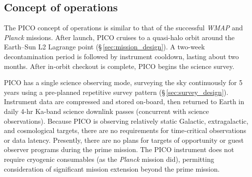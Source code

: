 \subsection{Concept of operations}
\label{sec:operations} %

The PICO concept of operations is similar to that of the successful
\textit{WMAP} \citep{Bennett2003} and \textit{Planck} \citep{Tauber2010} missions. After launch,
PICO cruises to a quasi-halo orbit around the Earth--Sun L2 Lagrange point
(\S\,\ref{sec:mission_design}). A two-week decontamination period is followed by
instrument cooldown, lasting about two months. After in-orbit checkout is complete, PICO begins
the science survey.

PICO has a single science observing mode, surveying the sky
continuously for 5 years using a pre-planned repetitive survey pattern
(\S\,\ref{sec:survey_design}). Instrument data are compressed and stored on-board, then
returned to Earth in daily 4-hr Ka-band science downlink passes
(concurrent with science observations). Because PICO is observing
relatively static Galactic, extragalactic, and cosmological targets,
there are no requirements for time-critical observations or data
latency. Presently, there are no plans for targets of opportunity or
guest observer programs during the prime mission. The PICO instrument
does not require cryogenic consumables (as the \textit{Planck} mission did),
permitting consideration of significant mission extension beyond the prime
mission.


